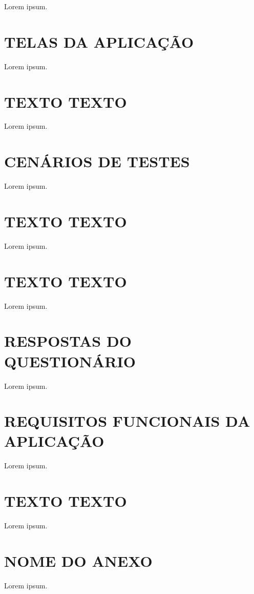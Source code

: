 \documentclass[english,brazilian]{UNISINOSartigo} %
\begin{document}
Lorem ipsum.

\section{TELAS DA APLICAÇÃO}

Lorem ipsum.

\section{TEXTO TEXTO}

Lorem ipsum.

\section{CENÁRIOS DE TESTES}

Lorem ipsum.

\section{TEXTO TEXTO}

Lorem ipsum.

\section{TEXTO TEXTO}

Lorem ipsum.

\section{RESPOSTAS DO QUESTIONÁRIO}

Lorem ipsum.

\section{REQUISITOS FUNCIONAIS DA APLICAÇÃO}

Lorem ipsum.

\section{TEXTO TEXTO}

Lorem ipsum.

\annex
\section{NOME DO ANEXO}

Lorem ipsum.
\end{document}
